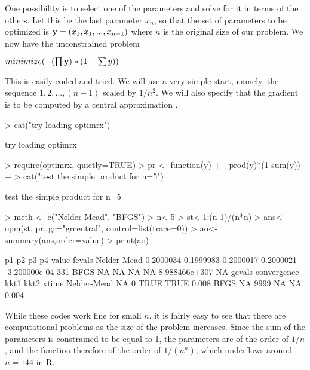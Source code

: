 \documentclass[11pt]{article}
\newcommand{\B}[1]{{\bf #1 \rm}}
\newcommand{\R}{{\sf R}}
\begin{document}
One possibility is to select one of the parameters and solve for it in 
terms of the others. Let this
be the last parameter $x_n$, so that the set of parameters to be 
optimized is $ \B{y} = (x_1, x_1, ..., x_{n-1})$ where 
$n$ is the original size of our problem. We now have the unconstrained problem
\vspace*{10pt}

$ minimize ( - (\prod{\B{y}}) * (1 - \sum{y} ) ) $

\vspace*{10pt}
This is easily coded and tried. We will use a very simple start, namely, the sequence $1,2, ...,
(n-1)$ scaled by $1/n^2$. We will also specify that the gradient is to be computed by a 
central approximation \citep{optextras}.

\begin{Schunk}
\begin{Sinput}
> cat("try loading optimrx\n")
\end{Sinput}
\begin{Soutput}
try loading optimrx
\end{Soutput}
\begin{Sinput}
> require(optimrx, quietly=TRUE)
> pr <- function(y) {
+ - prod(y)*(1-sum(y))
+ }
> cat("test the simple product for n=5\n")
\end{Sinput}
\begin{Soutput}
test the simple product for n=5
\end{Soutput}
\begin{Sinput}
> meth <- c("Nelder-Mead", "BFGS")
> n<-5
>   st<-1:(n-1)/(n*n)
>    ans<-opm(st, pr, gr="grcentral", control=list(trace=0))
>    ao<-summary(ans,order=value)
> print(ao)
\end{Sinput}
\begin{Soutput}
                   p1        p2        p3        p4          value fevals
Nelder-Mead 0.2000034 0.1999983 0.2000017 0.2000021  -3.200000e-04    331
BFGS               NA        NA        NA        NA  8.988466e+307     NA
            gevals convergence kkt1 kkt2 xtime
Nelder-Mead     NA           0 TRUE TRUE 0.008
BFGS            NA        9999   NA   NA 0.004
\end{Soutput}
\end{Schunk}


While these codes work fine for small $n$, it is fairly easy to see that there are 
computational problems as the size of the problem increases. Since the sum of the 
parameters is constrained to be equal to 1, the parameters are of the order of $1/n$,
and the function therefore of the order of $1/(n^n)$, which underflows around $n=144$ in 
\R. 
\end{document}
